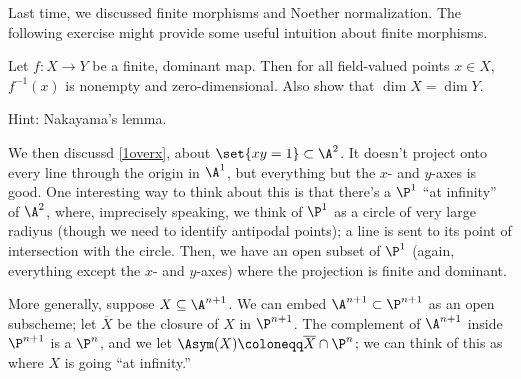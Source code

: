 Last time, we discussed finite morphisms and Noether normalization. The following exercise might provide some
useful intuition about finite morphisms.
\begin{ex}
Let $f\colon X\to Y$ be a finite, dominant map. Then for all field-valued points $x\in X$, $f^{-1}(x)$ is nonempty
and zero-dimensional. Also show that $\dim X = \dim Y$.
\end{ex}
Hint: Nakayama's lemma.

We then discussd \cref{1overx}, about $\set{xy = 1}\subset\A^2$. It doesn't project onto every line through the
origin in $\A^1$, but everything but the $x$- and $y$-axes is good. One interesting way to think about this is that
there's a $\P^1$ ``at infinity'' of $\A^2$, where, imprecisely speaking, we think of $\P^1$ as a circle of very
large radiyus (though we need to identify antipodal points); a line is sent to its point of intersection with the
circle. Then, we have an open subset of $\P^1$ (again, everything except the $x$- and $y$-axes) where the
projection is finite and dominant.

More generally, suppose $X\subseteq\A^{n+1}$. We can embed $\A^{n+1}\subset\P^{n+1}$ as an open subscheme; let
$\overline X$ be the closure of $X$ in $\P^{n+1}$. The complement of $\A^{n+1}$ inside $\P^{n+1}$ is a $\P^n$, and
we let $\Asym(X)\coloneqq\overline X\cap\P^n$; we can think of this as where $X$ is going ``at infinity.''

